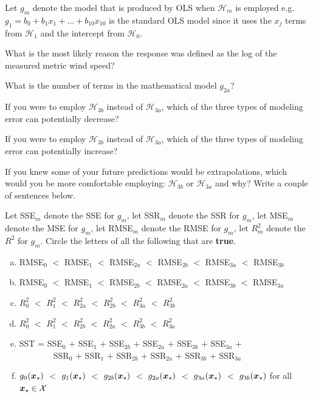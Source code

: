 \documentclass[12pt]{article}
\begin{document}
\noindent Let $g_m$ denote the model that is produced by OLS when $\mathcal{H}_m$ is employed e.g. $g_1 = b_0 + b_1 x_1 + \ldots + b_{10} x_{10}$ is the standard OLS model since it uses the $x_j$ terms from $\mathcal{H}_1$ and the intercept from $\mathcal{H}_0$.

\benum

 What is the most likely reason the response was defined as the log of the measured metric wind speed? 

 What is the number of terms in the mathematical model $g_{2a}$? 

 If you were to employ $\mathcal{H}_{3b}$ instead of $\mathcal{H}_{3a}$, which of the three types of modeling error can potentially decrease? 

 If you were to employ $\mathcal{H}_{3b}$ instead of $\mathcal{H}_{3a}$, which of the three types of modeling error can potentially increase? 

 If you knew some of your future predictions would be extrapolations, which would you be more comfortable employing: $\mathcal{H}_{3b}$ or $\mathcal{H}_{3a}$ and why? Write a couple of sentences below. 

 Let SSE$_m$ denote the SSE for $g_m$, let SSR$_m$ denote the SSR for $g_m$, let MSE$_m$ denote the MSE for $g_m$, let RMSE$_m$ denote the RMSE for $g_m$, let $R^2_m$ denote the $R^2$ for $g_m$. Circle the letters of all the following that are \textbf{true}.

\begin{enumerate}[(a)]
\item RMSE$_0$ $<$ RMSE$_{1}$ $<$ RMSE$_{2a}$ $<$ RMSE$_{2b}$ $<$ RMSE$_{3a}$ $<$ RMSE$_{3b}$
\item RMSE$_0$ $<$ RMSE$_{1}$ $<$ RMSE$_{2b}$ $<$ RMSE$_{2a}$ $<$ RMSE$_{3b}$ $<$ RMSE$_{3a}$
\item $R^2_0$ $<$ $R^2_{1}$ $<$ $R^2_{2a}$ $<$ $R^2_{2b}$ $<$ $R^2_{3a}$ $<$ $R^2_{3b}$
\item $R^2_0$ $<$ $R^2_{1}$ $<$ $R^2_{2b}$ $<$ $R^2_{2a}$ $<$ $R^2_{3b}$ $<$ $R^2_{3a}$
\item SST = SSE$_0$ $+$ SSE$_{1}$ $+$ SSE$_{2b}$ $+$ SSE$_{2a}$ $+$ SSE$_{3b}$ $+$ SSE$_{3a}$ +\\  ~~~~~~~~SSR$_0$ $+$ SSR$_{1}$ $+$ SSR$_{2b}$ $+$ SSR$_{2a}$ $+$ SSR$_{3b}$ $+$ SSR$_{3a}$
\item $g_0(\boldsymbol{x}_\star)$ $<$ $g_{1}(\boldsymbol{x}_\star)$ $<$ $g_{2b}(\boldsymbol{x}_\star)$ $<$ $g_{2a}(\boldsymbol{x}_\star)$ $<$ $g_{3a}(\boldsymbol{x}_\star)$ $<$ $g_{3b}(\boldsymbol{x}_\star)$ for all $\boldsymbol{x}_\star \in \mathcal{X}$
\end{enumerate}
\end{document}
